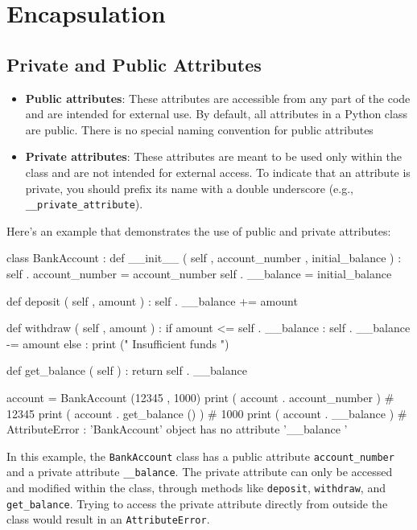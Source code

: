 \documentclass[12pt, a4paper, oneside, justified]{article}
\begin{document}
\section{Encapsulation}
\subsection{Private and Public Attributes}
\begin{itemize}
    \item \textbf{Public attributes}: These attributes are accessible from any part of the code and are intended for
    external use. By default, all attributes in a Python class are public. There is no special naming
    convention for public attributes
    \item \textbf{Private attributes}: These attributes are meant to be used only within the class and are not
    intended for external access. To indicate that an attribute is private, you should prefix its name
    with a double underscore (e.g., \texttt{\_\_private\_attribute}).
\end{itemize}
Here's an example that demonstrates the use of public and private attributes:
\begin{python}
    class BankAccount :
        def __init__ ( self , account_number , initial_balance ) :
            self . account_number = account_number
            self . __balance = initial_balance

        def deposit ( self , amount ) :
            self . __balance += amount

        def withdraw ( self , amount ) :
            if amount <= self . __balance :
                self . __balance -= amount
            else :
                print (" Insufficient funds ")

        def get_balance ( self ) :
            return self . __balance

    account = BankAccount (12345 , 1000)
    print ( account . account_number ) # 12345
    print ( account . get_balance () ) # 1000
    print ( account . __balance ) # AttributeError : 'BankAccount' object has no attribute '__balance '
\end{python}

In this example, the \texttt{BankAccount} class has a public attribute \texttt{account\_number} and a private
attribute \texttt{\_\_balance}. The private attribute can only be accessed and modified within the class,
through methods like \texttt{deposit}, \texttt{withdraw}, and \texttt{get\_balance}. Trying to access the private attribute
directly from outside the class would result in an \texttt{AttributeError}.
\end{document}
